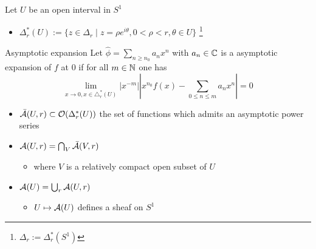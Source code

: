 \begin{frame}
  Let \textcolor{red!60!black}{$U$} be an open interval in $S^1$
  \begin{itemize}
    \item $\Delta_r^*(U):=
      \{z\in\Delta_r\mid z=\rho e^{i\theta},0<\rho<r,\theta\in U\}$%
\footnote{$\Delta_r:=\Delta_r^*(S^1)$}
  \end{itemize}
  \begin{center}
  \end{center}
\end{frame}

\begin{frame}{Asymptotic expansion}
Let $\hat\phi=\sum_{n\geq n_0}a_nx^n$ with $a_n\in\mathbb{C}$ is a asymptotic
expansion of $f$ at $0$ if for all $m\in\mathbb{N}$ one has
\[
  \lim_{x\to 0,x\in\triangle_r^*(U)}
  \left|x^{-m}\right|\left|x^{n_{0}}f(x)-\sum_{0\leq n\leq m}a_{n}x^{n}\right|
  =0
\]
\begin{itemize}
  \item $\bar{\mathcal{A}}(U,r)\subset\mathcal{O}(\Delta_r^*(U))$ the set of functions which
    admits an asymptotic power series
  \item $\mathcal{A}(U,r)=\bigcap_{V}\bar{\mathcal{A}}(V,r)$ 
    \begin{itemize}
      \item where $V$ is a relatively compact open subset of $U$
    \end{itemize}
  \item $\mathcal{A}(U)=\bigcup_r\mathcal{A}(U,r)$%
    \begin{itemize}
      \item $U\mapsto\mathcal{A}(U)$ defines a sheaf on $S^1$
    \end{itemize}
\end{itemize}
\end{frame}

